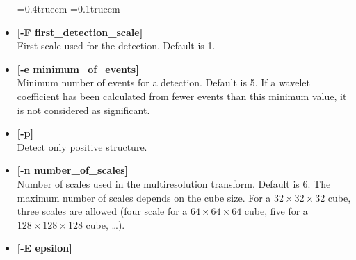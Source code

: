 \begin{itemize}
\baselineskip=0.4truecm
\itemsep=0.1truecm
\item {\bf [-F first\_detection\_scale]} \\
First scale used for the detection. Default is 1.
\item {\bf [-e minimum\_of\_events]}  \\
Minimum number of events for a detection. Default is 5. If a wavelet 
coefficient has been calculated from fewer events than this minimum
value, it is not considered as significant.
\item {\bf [-p]}  \\
Detect only positive structure.
\item {\bf [-n number\_of\_scales]}  \\
Number of scales used in the multiresolution transform.
Default is 6. The maximum number of scales depends on the 
cube size. For a $32 \times 32 \times 32$ cube, three scales are allowed (four
scale for a $64 \times 64 \times 64$ cube, 
five for a $128 \times 128 \times 128$ cube, \dots).
\item {\bf [-E epsilon]}  \\

\end{itemize}
